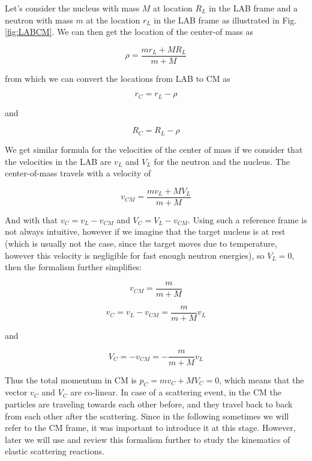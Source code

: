 Let's consider the nucleus with mass $M$ at location $R_L$ in the LAB frame and a neutron with mass $m$ at the location $r_L$ in the LAB frame as illustrated in Fig. \ref{fig:LABCM}. We can then get the location of the center-of mass as 

\begin{equation}
\rho = \frac{mr_L+MR_L}{m+M}
\end{equation}

from which we can convert the locations from LAB to CM as 

\begin{equation}
r_C=r_L - \rho
\end{equation}

and

\begin{equation}
R_C=R_L - \rho
\end{equation}

We get similar formula for the velocities of the center of mass if we consider that the velocities in the LAB are $v_L$ and $V_L$ for the neutron and the nucleus. The center-of-mass travels with a velocity of

\begin{equation}
v_{CM} = \frac{mv_L+MV_L}{m+M}
\end{equation}

And with that $v_C=v_L - v_{CM}$ and $V_C=V_L - v_{CM}$. Using such a reference frame is not always intuitive, however if we imagine that the target nucleus is at rest (which is usually not the case, since the target moves due to temperature, however this velocity is negligible for fast enough neutron energies), so $V_L=0$, then the formalism further simplifies:

\begin{equation}
v_{CM}=\frac{m}{m+M}
\end{equation}

\begin{equation}
v_C=v_L-v_{CM}=\frac{m}{m+M}v_L
\end{equation}

and

\begin{equation}
V_C=-v_{CM}=-\frac{m}{m+M}v_L
\end{equation}

Thus the total momentum in CM is $p_C=mv_C+MV_C=0$, which means that the vector $v_C$ and $V_C$ are co-linear. In case of a scattering event, in the CM the particles are traveling towards each other before, and they travel back to back from each other after the scattering. Since in the following sometimes we will refer to the CM frame, it was important to introduce it at this stage. However, later we will use and review this formalism further to study the kinematics of elastic scattering reactions.

